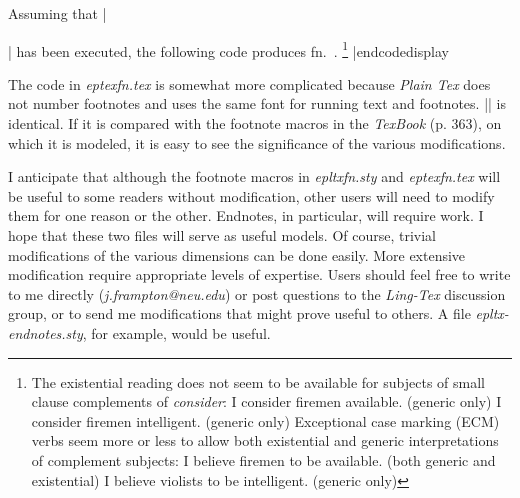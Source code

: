 Assuming that |\usepackage{epltxfn}| has been executed, the
following code produces fn.~\the\fnno.
\codedisplay
\footnote{%
The existential reading does not seem to be available for subjects of
small clause complements of {\it consider\/}:
\pex
\a I consider firemen available. (generic only)
\a I consider firemen intelligent. (generic only)
\xe
Exceptional case marking (ECM) verbs seem more or less to allow both
existential and generic interpretations of complement subjects:
\pex
\a I believe firemen to be available. (both generic and existential)
\a I believe violists to be intelligent. (generic only)
\xe
}
|endcodedisplay

The code in {\sl eptexfn.tex\/} is somewhat more complicated
because {\it Plain Tex\/} does not number footnotes and uses the
same font for running text and footnotes.  |\everyfootnote| is
identical.  If it is compared with the footnote macros in the
{\sl TexBook\/} (p. 363), on which it is modeled, it is easy to
see the significance of the various modifications.

I anticipate that although the footnote macros in {\sl epltxfn.sty\/}
and {\sl eptexfn.tex\/} will be useful to some readers without
modification, other users will need to modify them for one reason or
the other.  Endnotes, in particular, will require work.  I hope that
these two files will serve as useful models.  Of course, trivial
modifications of the various dimensions can be done easily.  More
extensive modification require appropriate levels of expertise.  Users
should feel free to write to me directly ({\sl j.frampton@neu.edu\/}) or
post questions to the {\sl Ling-Tex\/} discussion group, or to send me
modifications that might prove useful to others.  A file {\it
epltx-endnotes.sty}, for example, would be useful.


